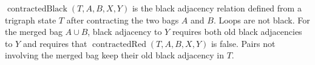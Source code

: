 \(\operatorname{contractedBlack}(T,A,B,X,Y)\) is the black adjacency relation
defined from a trigraph state \(T\) after contracting the two bags \(A\) and
\(B\).  Loops are not black.  For the merged bag \(A\cup B\), black adjacency
to \(Y\) requires both old black adjacencies to \(Y\) and requires that
\(\operatorname{contractedRed}(T,A,B,X,Y)\) is false.  Pairs not involving the
merged bag keep their old black adjacency in \(T\).
